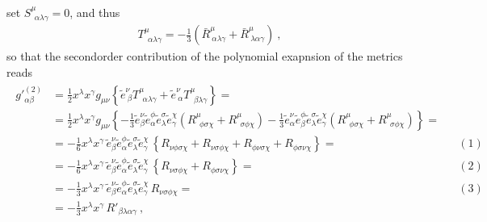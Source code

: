 \documentclass[letterpaper,10pt,english]{jupyterBook}
\begin{document}
\sphinxAtStartPar
{} set \(S^{\mu}_{\ \ \alpha \lambda \gamma} = 0\), and thus
\begin{equation*}
\begin{split}T^{\mu}_{\ \ \alpha \lambda \gamma} = - \frac{1}{3} \left( \bar{R}^{\mu}_{\ \alpha \lambda \gamma} + \bar{R}^{\mu}_{\ \lambda \alpha \gamma} \right) \ , \end{split}
\end{equation*}
\sphinxAtStartPar
so that the second\sphinxhyphen{}order contribution of the polynomial exapnsion of the metrics reads
\begin{equation*}
\begin{split}\begin{aligned}
 {g'}^{(2)}_{\alpha \beta}
 & = \frac{1}{2} x^{\lambda} x^{\gamma} g_{\mu \nu}
 \left\{ 
  \widetilde{e}^{\nu}_{\ \beta } T^{\mu}_{\ \ \alpha \lambda \gamma} + 
  \widetilde{e}^{\nu}_{\ \alpha} T^{\mu}_{\ \ \beta  \lambda \gamma}   
 \right\} = \\
 & = \frac{1}{2} x^{\lambda} x^{\gamma} g_{\mu \nu} \left\{ 
 - \frac{1}{3} \widetilde{e}^{\nu}_{\beta} \widetilde{e}^{\phi}_{\alpha} \widetilde{e}^{\sigma}_{\lambda} \widetilde{e}^{\chi}_{\gamma} \left( R^{\mu}_{\ \ \phi \sigma \chi} + R^{\mu}_{\ \ \sigma \phi \chi} \right)
 - \frac{1}{3} \widetilde{e}^{\nu}_{\alpha}\widetilde{e}^{\phi}_{\beta } \widetilde{e}^{\sigma}_{\lambda} \widetilde{e}^{\chi}_{\gamma} \left( R^{\mu}_{\ \ \phi \sigma \chi} + R^{\mu}_{\ \ \sigma \phi \chi} \right)
 \right\} = \\
 & = - \frac{1}{6} x^{\lambda} x^{\gamma} \, 
   \widetilde{e}^{\nu}_{\beta} \widetilde{e}^{\phi}_{\alpha} \widetilde{e}^{\sigma}_{\lambda} \widetilde{e}^{\chi}_{\gamma} \,
  \left\{ R_{\nu \phi \sigma \chi} + R_{\nu \sigma \phi \chi} + R_{\phi \nu \sigma \chi} + R_{\phi \sigma \nu \chi}
 \right\} = && (1) \\
 & = - \frac{1}{6} x^{\lambda} x^{\gamma} \, 
   \widetilde{e}^{\nu}_{\beta} \widetilde{e}^{\phi}_{\alpha} \widetilde{e}^{\sigma}_{\lambda} \widetilde{e}^{\chi}_{\gamma} \,
  \left\{ R_{\nu \sigma \phi \chi} + R_{\phi \sigma \nu \chi}
 \right\} = && (2) \\
 & = - \frac{1}{3} x^{\lambda} x^{\gamma} \, 
   \widetilde{e}^{\nu}_{\beta} \widetilde{e}^{\phi}_{\alpha} \widetilde{e}^{\sigma}_{\lambda} \widetilde{e}^{\chi}_{\gamma} \,
   R_{\nu \sigma \phi \chi} = && (3) \\
 & = - \frac{1}{3} x^{\lambda} x^{\gamma} \, 
   {R'}_{\beta \lambda \alpha \gamma} \ ,
\end{aligned}\end{split}
\end{equation*}
\end{document}
